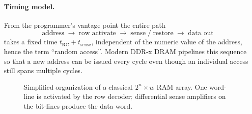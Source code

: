 \documentclass[11pt]{article}
\begin{document}
\paragraph{Timing model.}
From the programmer’s vantage point the entire path
\[
   \text{address} \;\longrightarrow\;
   \text{row activate} \;\longrightarrow\;
   \text{sense}\;/\;\text{restore} \;\longrightarrow\;
   \text{data out}
\]
takes a fixed time $t_{\mathrm{RC}}+t_{\mathrm{sense}}$,
independent of the numeric value of the address, hence the term
“random access’’.
Modern DDR-x DRAM pipelines this sequence so that a new address can be
issued every cycle even though an individual access still spans
multiple cycles.

\begin{figure}[ht]
\centering
{}
\caption{Simplified organization of a classical $2^{n}\!\times\!w$ RAM
array. One word-line is activated by the row decoder; differential
sense amplifiers on the bit-lines produce the data word.}
\label{fig:classicalRam}
\end{figure}
\end{document}
